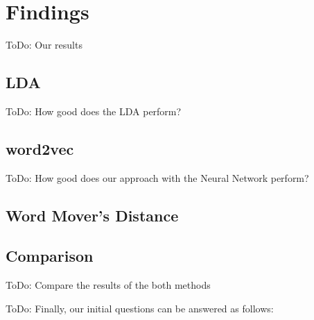 \section{Findings} %
\label{sec:findings}

\colorbox{yellow!30}{ToDo:} Our results

\subsection{LDA} %
\label{sub:findings_lda}

\colorbox{yellow!30}{ToDo:} How good does the LDA perform?

\subsection{word2vec} %
\label{sub:findings_w2v}

\colorbox{yellow!30}{ToDo:} How good does our approach with the Neural Network perform?

\subsection{Word Mover's Distance} %
\label{sub:findings_wmd}


\subsection{Comparison} %
\label{sub:findings_comparison}

\colorbox{yellow!30}{ToDo:} Compare the results of the both methods


\colorbox{yellow!30}{ToDo:} Finally, our initial questions can be answered as follows:

